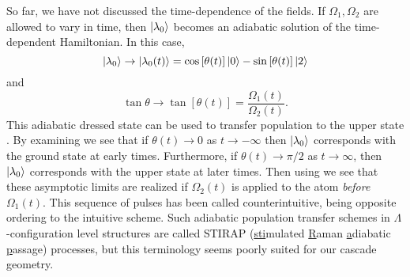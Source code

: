 So far, we have not discussed the time-dependence of the fields.  If
$\Omega_1,\Omega_2$ are allowed to vary in time, then
$\vert \lambda_0 \rangle$ becomes an adiabatic solution of the time-dependent
Hamiltonian.  In this case,
\begin{equation}
\vert \lambda_0 \rangle \rightarrow \vert \lambda_0(t) \rangle= \cos\left[\theta(t)\right]
\vert 0 \rangle - \sin\left[\theta(t)\right]\vert 2 \rangle
\label{dark}
\end{equation}
and
\begin{equation}
\tan\theta \rightarrow \tan\left[\theta(t)\right] = \frac{\Omega_1(t)}
{\Omega_2(t)}.
\label{theta}
\end{equation}
This adiabatic dressed state can be used to transfer
population to the upper state \cite{Kuklinski:89}.  By examining
 we see that if $\theta(t) \rightarrow 0$ as $ t \rightarrow -\infty
$ then $\vert \lambda_0 \rangle$ corresponds with the ground state at early times.
Furthermore, if $\theta(t) \rightarrow \pi/2$ as $ t \rightarrow \infty $, then
$\vert \lambda_0 \rangle$ corresponds with the upper state at later times.  Then using
 we see that these asymptotic limits are realized if $\Omega_2(t)$ is
applied to the atom {\em before} $\Omega_1(t)$.  This sequence of pulses has been
called counterintuitive, being opposite ordering to the
intuitive scheme.  Such adiabatic population transfer schemes in
$\Lambda$-configuration level structures are called STIRAP
(\underline{sti}mulated \underline{R}aman \underline{a}diabatic
\underline{p}assage) processes, but this terminology seems poorly suited for
our cascade geometry.

